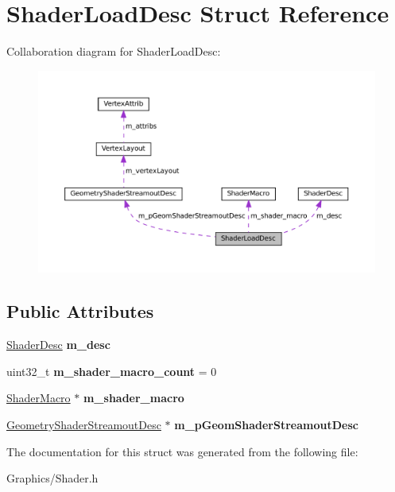 \hypertarget{structShaderLoadDesc}{}\section{Shader\+Load\+Desc Struct Reference}
\label{structShaderLoadDesc}


Collaboration diagram for Shader\+Load\+Desc\+:
\nopagebreak
\begin{figure}[H]
\begin{center}
\leavevmode
\includegraphics[width=350pt]{structShaderLoadDesc__coll__graph}
\end{center}
\end{figure}
\subsection*{Public Attributes}
\begin{DoxyCompactItemize}
\item 
\mbox{\label{structShaderLoadDesc_a0bb594a5f465dd4f8fa3f22f6b96642a}} 
\hyperlink{structShaderDesc}{Shader\+Desc} {\bfseries m\+\_\+desc}
\item 
\mbox{\label{structShaderLoadDesc_adba8efc2daf9054764b30e4ec1d427c4}} 
uint32\+\_\+t {\bfseries m\+\_\+shader\+\_\+macro\+\_\+count} = 0
\item 
\mbox{\label{structShaderLoadDesc_a31cc7278348cbfa75e1c679ff4db6616}} 
\hyperlink{structShaderMacro}{Shader\+Macro} $\ast$ {\bfseries m\+\_\+shader\+\_\+macro}
\item 
\mbox{\label{structShaderLoadDesc_af3dd1fbba5f6368cac4fcf4c581586d0}} 
\hyperlink{structGeometryShaderStreamoutDesc}{Geometry\+Shader\+Streamout\+Desc} $\ast$ {\bfseries m\+\_\+p\+Geom\+Shader\+Streamout\+Desc}
\end{DoxyCompactItemize}


The documentation for this struct was generated from the following file\+:\begin{DoxyCompactItemize}
\item 
Graphics/Shader.\+h\end{DoxyCompactItemize}
